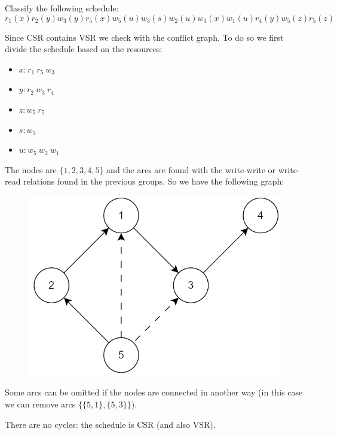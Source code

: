 \documentclass[12pt, a4paper]{report}
\newtheorem[style=M,bodystyle=\normalfont]{theorem}{Theorem}
\newtheorem[style=M,bodystyle=\normalfont]{corollary}{Corollary}
\newtheorem[style=M,bodystyle=\normalfont]{lemma}{Lemma}
\newtheorem[style=M,bodystyle=\normalfont]{definition}{Definition}
\begin{document}
    \newpage
    
    \begin{Exercise}[label=3]
        Classify the following schedule: 
        \[r_1(x) r_2(y) w_3(y) r_5(x) w_5(u) w_3(s)w_2(u) w_3(x) w_1(u) r_4(y) w_5(z) r_5(z)\]
    \end{Exercise}
    \begin{Answer}[ref=3]
        Since CSR contains VSR we check with the conflict graph. To do so we first divide the schedule based on the resources: 
        \begin{itemize}
            \item $x: r_1 \: r_5 \:w_3$
            \item $y: r_2 \: w_3 \:r_4$
            \item $z: w_5 \: r_5$
            \item $s: w_3$
            \item $u: w_5 \: w_2 \:w_1$
        \end{itemize}
        The nodes are $\{1,2,3,4,5\}$ and the arcs are found with the write-write or write-read relations found in the previous groups. So we have the following graph:
        \begin{figure}[H]
            \centering
            \includegraphics[width=0.5\linewidth]{images/conflictgraph.png}
        \end{figure}
        Some arcs can be omitted if the nodes are connected in another way (in this case we can remove arcs $\{\{5,1\},\{5,3\}\}$). 

        There are no cycles: the schedule is CSR (and also VSR). 
    \end{Answer}

    \newpage
    
\end{document}
